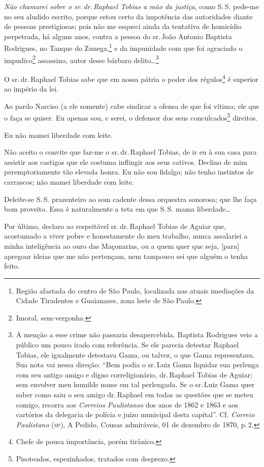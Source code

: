 \emph{Não chamarei sobre o sr.\,dr.\,Raphael Tobias a mão da justiça},
como S.\,S. pede-me no seu aludido escrito, porque estou certo da
impotência das autoridades diante de pessoas prestigiosas; pois não me
esqueci ainda da tentativa de homicídio perpetrada, há alguns anos,
contra a pessoa do sr.\,João Antonio Baptista Rodrigues, no Tanque do
Zunega,\footnote{ Região afastada do centro de São Paulo, localizada
  nas atuais imediações da Cidade Tiradentes e Guaianases, zona leste de
  São Paulo.} e da impunidade com que foi agraciado o
impudico\footnote{ Imoral, sem-vergonha.} assassino, autor desse
bárbaro delito\ldots{}\footnote{ A menção a esse crime não passaria
  desapercebida. Baptista Rodrigues veio a público um pouco irado com
  referência. Se ele parecia detestar Raphael Tobias, ele igualmente
  detestava Gama, ou talvez, o que Gama representava. Sua nota vai nessa
  direção: ``Bem podia o sr.\,Luiz Gama liquidar sua perlenga com seu
  antigo amigo e digno correligionário, dr.\,Raphael Tobias de Aguiar;
  sem envolver meu humilde nome em tal perlengada. Se o sr.\,Luiz Gama
  quer saber como saiu o seu amigo dr.\,Raphael em todas as questões que
  se meteu comigo, recorra aos \emph{Correios Paulistanos} dos anos de
  1862 e 1863 e aos cartórios da delegacia de polícia e juízo municipal
  desta capital''. Cf. \emph{Correio Paulistano} (\textsc{sp}), A Pedido,
  Cousas admiráveis, 01 de dezembro de 1870, p.\,2.}

O sr.\,dr.\,Raphael Tobias sabe que em nossa pátria o poder dos
régulos\footnote{ Chefe de pouca importância, porém tirânico.} é
superior ao império da lei.

Ao pardo Narciso (a ele somente) cabe sindicar a ofensa de que foi
vítima; ele que o faça se quiser. Eu apenas sou, e serei, o defensor dos
seus conculcados\footnote{ Pisoteados, espezinhados, tratados com
  desprezo.} direitos.

Eu não mamei liberdade com leite.

Não aceito o convite que faz-me o sr.\,dr.\,Raphael Tobias, de ir eu à sua
casa para assistir aos castigos que ele costuma inflingir aos seus
cativos. Declino de mim peremptoriamente tão elevada honra. Eu não sou
fidalgo; não tenho instintos de carrascos; não mamei liberdade com
leite.

Deleite-se S.\,S. prazenteiro ao som cadente dessa orquestra sonorosa;
que lhe faça bom proveito. Essa é naturalmente a teta em que S.\,S. mama
liberdade\ldots{}

Por último, declaro ao respeitável sr.\,dr.\,Raphael Tobias de Aguiar que,
acostumado a viver pobre e honestamente do meu trabalho, nunca
assalariei a minha inteligência ao ouro das Maçonarias, ou a quem quer
que seja, {[}para{]} apregoar ideias que me não pertençam, nem tampouco
sei que alguém o tenha feito.

